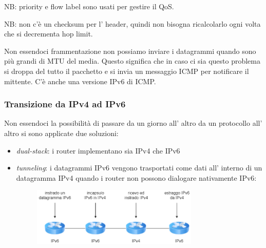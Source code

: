 NB: priority e flow label sono usati per gestire il QoS.

NB: non c'è un checksum per l' header, quindi non bisogna ricalcolarlo ogni volta che si decrementa hop limit.

Non essendoci frammentazione non possiamo inviare i datagrammi quando sono più grandi di MTU del media.
Questo significa che in caso ci sia questo problema si droppa del tutto il pacchetto e si invia un messaggio ICMP per notificare il mittente.
C'è anche una versione IPv6 di ICMP.

\subsubsection{Transizione da IPv4 ad IPv6}
Non essendoci la possibilità di passare da un giorno all' altro da un protocollo all' altro si sono applicate due soluzioni:
\begin{itemize}
    \item \emph{dual-stack}: i router implementano sia IPv4 che IPv6
    
    \item \emph{tunneling}: i datagrammi IPv6 vengono trasportati come dati all' interno di un datagramma IPv4 quando i router non possono dialogare nativamente IPv6:
    \begin{figure}[H]
        \centering
        \includegraphics[width=300px]{images/5_Internetworking/ipv6_tunnelling.png}
    \end{figure}
\end{itemize}
